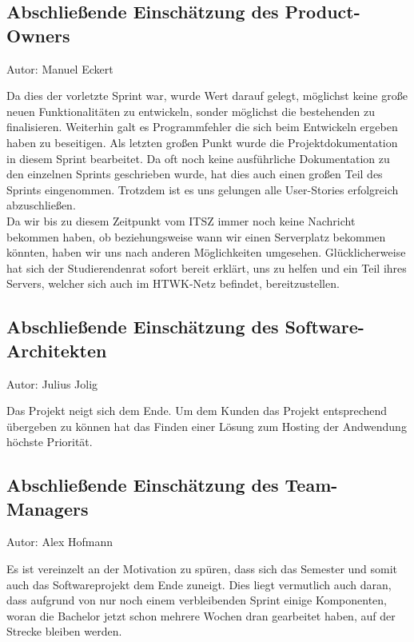 \subsection{Abschließende Einschätzung des Product-Owners}
{\small Autor: Manuel Eckert}

Da dies der vorletzte Sprint war, wurde Wert darauf gelegt, möglichst keine große neuen Funktionalitäten zu entwickeln, sonder möglichst die bestehenden zu finalisieren. Weiterhin galt es Programmfehler die sich beim Entwickeln ergeben haben zu beseitigen. Als letzten großen Punkt wurde die Projektdokumentation in diesem Sprint bearbeitet. Da oft noch keine ausführliche Dokumentation zu den einzelnen Sprints geschrieben wurde, hat dies auch einen großen Teil des Sprints eingenommen. Trotzdem ist es uns gelungen alle User-Stories erfolgreich abzuschließen. \\
Da wir bis zu diesem Zeitpunkt vom ITSZ immer noch keine Nachricht bekommen haben, ob beziehungsweise wann wir einen Serverplatz bekommen könnten, haben wir uns nach anderen Möglichkeiten umgesehen. Glücklicherweise hat sich der Studierendenrat sofort bereit erklärt, uns zu helfen und ein Teil ihres Servers, welcher sich auch im HTWK-Netz befindet, bereitzustellen.

\subsection{Abschließende Einschätzung des Software-Architekten}
{\small Autor: Julius Jolig}

Das Projekt neigt sich dem Ende. Um dem Kunden das Projekt entsprechend übergeben zu können hat das Finden einer Lösung zum Hosting der Andwendung höchste Priorität. 

\subsection{Abschließende Einschätzung des Team-Managers}
{\small Autor: Alex Hofmann}

Es ist vereinzelt an der Motivation zu spüren, dass sich das Semester und somit auch das Softwareprojekt dem Ende zuneigt.
Dies liegt vermutlich auch daran, dass aufgrund von nur noch einem verbleibenden Sprint einige Komponenten, woran die Bachelor jetzt schon mehrere Wochen dran gearbeitet haben, auf der Strecke bleiben werden.
